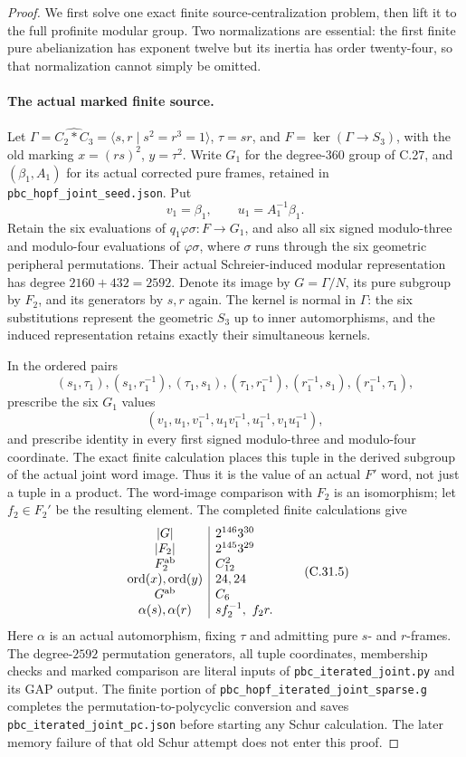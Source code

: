 \begin{proof}
We first solve one exact finite source-centralization problem, then
lift it to the full profinite modular group. Two normalizations are
essential: the first finite pure abelianization has exponent twelve
but its inertia has order twenty-four, so that normalization cannot
simply be omitted.

\paragraph{The actual marked finite source.}
Let $\Gamma=\widehat{C_2*C_3}=\langle s,r\mid s^2=r^3=1\rangle$,
$\tau=sr$, and $F=\ker(\Gamma\to S_3)$, with the old marking
$x=(rs)^2$, $y=\tau^2$. Write $G_1$ for the degree-$360$ group of
C.27, and $(\beta_1,A_1)$ for its actual corrected pure frames,
retained in \texttt{pbc\_hopf\_joint\_seed.json}. Put
\[
                  v_1=\beta_1,\qquad u_1=A_1^{-1}\beta_1.
 \tag{C.31.3}
\]
Retain the six evaluations of $q_1\varphi\sigma:F\to G_1$,
and also all six signed modulo-three and modulo-four evaluations
of $\varphi\sigma$, where $\sigma$ runs through the six geometric
peripheral permutations. Their actual Schreier-induced modular
representation has degree $2160+432=2592$. Denote its image by
$G=\Gamma/N$, its pure subgroup by $F_2$, and its generators by
$s,r$ again. The kernel is normal in $\Gamma$: the six substitutions
represent the geometric $S_3$ up to inner automorphisms, and the
induced representation retains exactly their simultaneous kernels.

In the ordered pairs
\[
           (s_1,\tau_1),(s_1,r_1^{-1}),
           (\tau_1,s_1),(\tau_1,r_1^{-1}),
           (r_1^{-1},s_1),(r_1^{-1},\tau_1),
\]
prescribe the six $G_1$ values
\[
 (v_1,u_1,v_1^{-1},u_1v_1^{-1},u_1^{-1},v_1u_1^{-1}),
 \tag{C.31.4}
\]
and prescribe identity in every first signed modulo-three and
modulo-four coordinate. The exact finite calculation places this
tuple in the derived subgroup of the actual joint word image.
Thus it is the value of an actual $F'$ word, not just a tuple in a
product. The word-image comparison with $F_2$ is an isomorphism;
let $f_2\in F_2'$ be the resulting element. The completed finite
calculations give
\[
\begin{array}{c|l}
 |G|&2^{146}3^{30}\\
 |F_2|&2^{145}3^{29}\\
 F_2^{\rm ab}&C_{12}^2\\
 \operatorname{ord}(x),\operatorname{ord}(y)&24,24\\
 G^{\rm ab}&C_6\\
 \alpha(s),\alpha(r)&s f_2^{-1},\ f_2r.
\end{array}
 \tag{C.31.5}
\]
Here $\alpha$ is an actual automorphism, fixing $\tau$ and admitting
pure $s$- and $r$-frames. The degree-$2592$ permutation generators,
all tuple coordinates, membership checks and marked comparison are
literal inputs of \texttt{pbc\_iterated\_joint.py} and its GAP
output. The finite portion of
\texttt{pbc\_hopf\_iterated\_joint\_sparse.g} completes the
permutation-to-polycyclic conversion and saves
\texttt{pbc\_iterated\_joint\_pc.json} before starting any Schur
calculation. The later memory failure of that old Schur attempt
does not enter this proof.


\end{proof}
